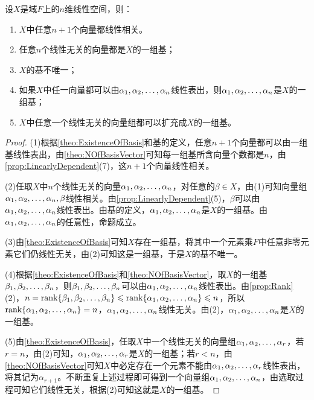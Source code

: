 \begin{property}\label{prop:nDimensionalLinearSpace}
	设$X$是域$F$上的$n$维线性空间，则：
	\begin{enumerate}
		\item $X$中任意$n+1$个向量都线性相关。
		\item 任意$n$个线性无关的向量都是$X$的一组基；
		\item $X$的基不唯一；
		\item 如果$X$中任一向量都可以由$\alpha_1, \alpha_2, \dots, \alpha_{n}$线性表出，则$\alpha_1, \alpha_2, \dots, \alpha_{n}$是$X$的一组基；
		\item $X$中任意一个线性无关的向量组都可以扩充成$X$的一组基。
	\end{enumerate}
\end{property}
\begin{proof}
	(1)根据\cref{theo:ExistenceOfBasis}和基的定义，任意$n+1$个向量都可以由一组基线性表出，由\cref{theo:NOfBasisVector}可知每一组基所含向量个数都是$n$，由\cref{prop:LinearlyDependent}(7)，这$n+1$个向量线性相关。\par
	(2)任取$X$中$n$个线性无关的向量$\alpha_1, \alpha_2, \dots, \alpha_{n}$，对任意的$\beta\in X$，由(1)可知向量组$\alpha_1, \alpha_2, \dots, \alpha_{n},\beta$线性相关。由\cref{prop:LinearlyDependent}(5)，$\beta$可以由$\alpha_1, \alpha_2, \dots, \alpha_{n}$线性表出。由基的定义，$\alpha_1, \alpha_2, \dots, \alpha_{n}$是$X$的一组基。由$\alpha_1, \alpha_2, \dots, \alpha_{n}$的任意性，命题成立。\par
	(3)由\cref{theo:ExistenceOfBasis}可知$X$存在一组基，将其中一个元素乘$F$中任意非零元素它们仍线性无关，由(2)可知这是一组基，于是$X$的基不唯一。\par
	(4)根据\cref{theo:ExistenceOfBasis}和\cref{theo:NOfBasisVector}，取$X$的一组基$\beta_1, \beta_2, \dots, \beta_{n}$，则$\beta_1, \beta_2, \dots, \beta_{n}$可以由$\alpha_1, \alpha_2, \dots, \alpha_{n}$线性表出。由\cref{prop:Rank}(2)，$n=\operatorname{rank}\{\beta_1, \beta_2, \dots, \beta_{n}\}\leqslant\operatorname{rank}\{\alpha_1, \alpha_2, \dots, \alpha_{n}\}\leqslant n$，所以$\operatorname{rank}\{\alpha_1, \alpha_2, \dots, \alpha_{n}\}=n$，$\alpha_1, \alpha_2, \dots, \alpha_{n}$线性无关。由(2)，$\alpha_1, \alpha_2, \dots, \alpha_{n}$是$X$的一组基。\par
	(5)由\cref{theo:ExistenceOfBasis}，任取$X$中一个线性无关的向量组$\alpha_1, \alpha_2, \dots, \alpha_{r}$，若$r=n$，由(2)可知，$\alpha_1, \alpha_2, \dots, \alpha_{r}$是$X$的一组基；若$r<n$，由\cref{theo:NOfBasisVector}可知$X$中必定存在一个元素不能由$\alpha_1, \alpha_2, \dots, \alpha_{r}$线性表出，将其记为$\alpha_{r+1}$。不断重复上述过程即可得到一个向量组$\alpha_1, \alpha_2, \dots, \alpha_{n}$，由选取过程可知它们线性无关，根据(2)可知这就是$X$的一组基。
\end{proof}
